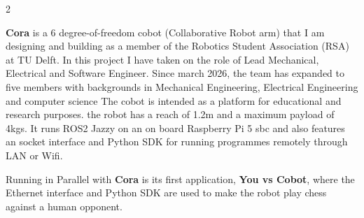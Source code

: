 \documentclass[8pt, a4paper, withhyper]{altacv}
\begin{document}
  \begin{paracol}
    {2}




    
     {}    
    \textbf{Cora} is a 6 degree-of-freedom cobot (Collaborative Robot arm) that I am
    designing and building as a member of the Robotics Student Association (RSA)
    at TU Delft. In this project I have taken on the role of Lead Mechanical,
    Electrical and Software Engineer. Since march 2026, the team has expanded 
    to five members with backgrounds in Mechanical Engineering, 
    Electrical Engineering and computer science
    The cobot is intended as a platform for educational and research purposes. 
    the robot has a reach of 1.2m and a maximum payload of 4kgs.
    It runs ROS2 Jazzy on an on board Raspberry Pi 5 sbc 
    and also features an socket interface and Python SDK for running programmes 
    remotely through LAN or Wifi.
    
    \divider
    
     {}
    Running in Parallel with \textbf{Cora} is its first application, \textbf{You vs Cobot}, 
    where the Ethernet interface and Python SDK are used 
    to make the robot play chess against a human opponent.


\end{paracol}
\end{document}

